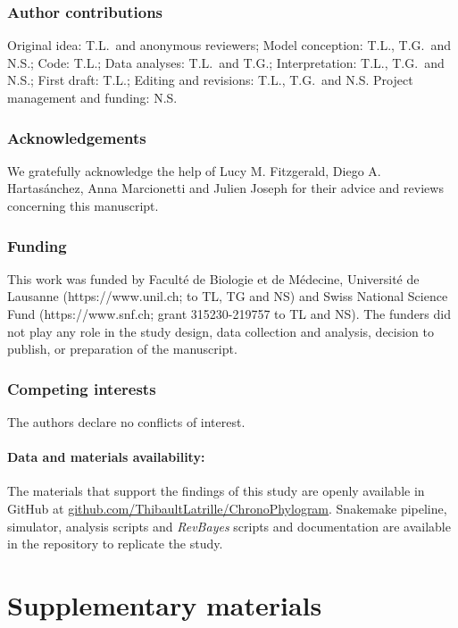 \documentclass{article}
\begin{document}

\section*{Author contributions}
Original idea: T.L.\ and anonymous reviewers;
Model conception: T.L., T.G.\ and N.S.;
Code: T.L.;
Data analyses: T.L.\ and T.G.;
Interpretation: T.L., T.G.\ and N.S.;
First draft: T.L.;
Editing and revisions: T.L., T.G.\ and N.S.
Project management and funding: N.S\@.

\section*{Acknowledgements}
\label{sec:acknowledgment}
We gratefully acknowledge the help of Lucy M. Fitzgerald, Diego A. Hartasánchez, Anna Marcionetti and Julien Joseph for their advice and reviews concerning this manuscript.

\section*{Funding}
This work was funded by Faculté de Biologie et de Médecine, Université de Lausanne (https://www.unil.ch; to TL, TG and NS) and Swiss National Science Fund (https://www.snf.ch; grant 315230-219757 to TL and NS). The funders did not play any role in the study design, data collection and analysis, decision to publish, or preparation of the manuscript.

\section*{Competing interests}
The authors declare no conflicts of interest.

\subsection*{Data and materials availability:}
The materials that support the findings of this study are openly available in GitHub at \href{https://github.com/ThibaultLatrille/ChronoPhylogram}{github.com/ThibaultLatrille/ChronoPhylogram}.
Snakemake pipeline, simulator, analysis scripts and \textit{RevBayes} scripts and documentation are available in the repository to replicate the study.

\printbibliography

\newpage

\part*{Supplementary materials}
\renewcommand{\thetable}{S\arabic{table}}
\renewcommand{\thefigure}{S\arabic{figure}}
\setcounter{figure}{0}
\setcounter{table}{0}
\setcounter{section}{0}
\end{document}
